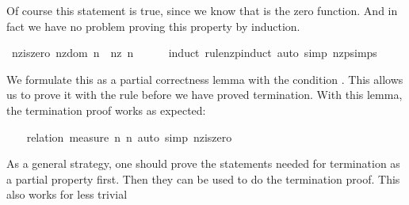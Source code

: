 \begin{isabellebody}
\begin{isamarkuptxt}
  Of course this statement is true, since we know that  is
  the zero function. And in fact we have no problem proving this
  property by induction.%
\end{isamarkuptxt}%
\isamarkuptrue%
%
\endisatagproof
{\isafoldproof}%
%
\isadelimproof
%
\endisadelimproof
{}\isamarkupfalse%
\ nz{}is{}zero{}\ {}nz{}dom\ n\ {}\ nz\ n\ {}\ {}{}\isanewline
%
\isadelimproof
\ \ %
\endisadelimproof
%
\isatagproof
{}\isamarkupfalse%
\ {}induct\ rule{}nz{}pinduct{}\ {}auto\ simp{}\ nz{}psimps{}%
\endisatagproof
{\isafoldproof}%
%
\isadelimproof
%
\endisadelimproof
%
\begin{isamarkuptext}%
We formulate this as a partial correctness lemma with the condition
  . This allows us to prove it with the  rule before we have proved termination. With this lemma,
  the termination proof works as expected:%
\end{isamarkuptext}%
\isamarkuptrue%
\isamarkupfalse%
\isanewline
%
\isadelimproof
\ \ %
\endisadelimproof
%
\isatagproof
{}\isamarkupfalse%
\ {}relation\ {}measure\ {}{}n{}\ n{}{}{}\ {}auto\ simp{}\ nz{}is{}zero{}%
\endisatagproof
{\isafoldproof}%
%
\isadelimproof
%
\endisadelimproof
%
\begin{isamarkuptext}%
As a general strategy, one should prove the statements needed for
  termination as a partial property first. Then they can be used to do
  the termination proof. This also works for less trivial

\end{isamarkuptext}
\end{isabellebody}
